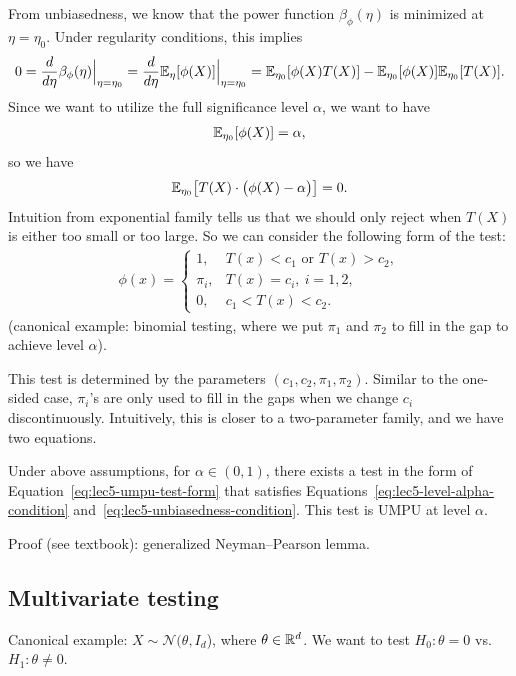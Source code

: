 \documentclass[11pt,letterpaper]{article}
\numberwithin{theorem}{lecture}
\numberwithin{proposition}{lecture}
\numberwithin{lemma}{lecture}
\numberwithin{claim}{lecture}
\numberwithin{corollary}{lecture}
\numberwithin{definition}{lecture}
\numberwithin{conjecture}{lecture}
\numberwithin{remark}{lecture}
\numberwithin{example}{lecture}
\numberwithin{equation}{lecture}
\begin{document}
From unbiasedness, we know that the power function $\beta_\phi (\eta)$ is minimized at $\eta = \eta_0$. Under regularity conditions, this implies
\begin{align*}
  0 = \frac{d}{d \eta} \beta_\phi (\eta) \Big|_{\eta = \eta_0} = \frac{d}{d \eta} {\mathbb{E}}_\eta [\phi (X)] \Big|_{\eta = \eta_0} = {\mathbb{E}}_{\eta_0} [\phi (X) T(X)] - {\mathbb{E}}_{\eta_0} [\phi (X)] {\mathbb{E}}_{\eta_0} [T(X)].
\end{align*}
Since we want to utilize the full significance level $\alpha$, we want to have
\begin{align}
{\mathbb{E}}_{\eta_0} [\phi (X)] = \alpha, \label{eq:lec5-level-alpha-condition}
\end{align}
so we have
\begin{align}
  {\mathbb{E}}_{\eta_0} \big[ T (X) \cdot \big( \phi (X) - \alpha \big) \big] = 0. \label{eq:lec5-unbiasedness-condition}
\end{align}
Intuition from exponential family tells us that we should only reject when $T(X)$ is either too small or too large. So we can consider the following form of the test:
\begin{align}
  \phi (x) = \begin{cases}
    1, & T (x) < c_1 \text{ or } T (x) > c_2,\\
    \pi_i, & T (x) = c_i,~ i = 1, 2, \\
    0, & c_1 < T (x) < c_2.
  \end{cases}\label{eq:lec5-umpu-test-form}
\end{align}
(canonical example: binomial testing, where we put $\pi_1$ and $\pi_2$ to fill in the gap to achieve level $\alpha$).

This test is determined by the parameters $(c_1, c_2, \pi_1, \pi_2)$. Similar to the one-sided case, $\pi_i$'s are only used to fill in the gaps when we change $c_i$ discontinuously. Intuitively, this is closer to a two-parameter family, and we have two equations.
\begin{theorem}
  Under above assumptions, for $\alpha \in (0, 1)$, there exists a test in the form of Equation~\eqref{eq:lec5-umpu-test-form} that satisfies Equations~\eqref{eq:lec5-level-alpha-condition} and~\eqref{eq:lec5-unbiasedness-condition}. This test is UMPU at level $\alpha$.
\end{theorem}
Proof (see textbook): generalized Neyman--Pearson lemma.

\subsection{Multivariate testing}
Canonical example: $X \sim \mathcal{N} (\theta, I_d$), where $\theta \in \mathbb{R}^d$. We want to test $H_0: \theta = 0$ vs. $H_1: \theta \neq 0$.
\end{document}
